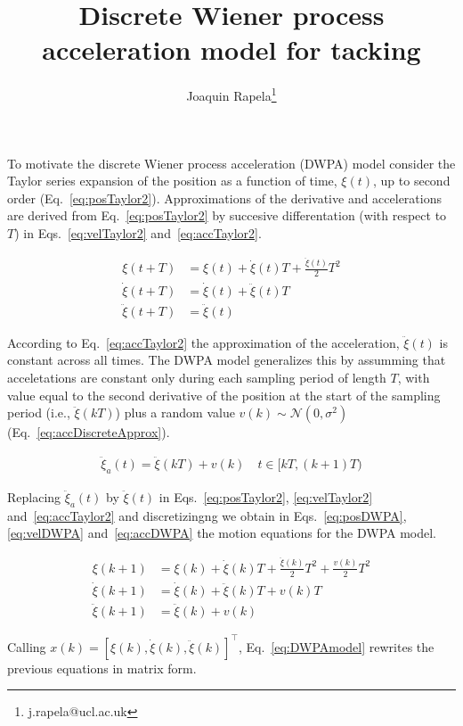 \documentclass{article}
\title{Discrete Wiener process acceleration model for tacking}
\author{Joaquin Rapela\thanks{j.rapela@ucl.ac.uk}}
\begin{document}
\maketitle

To motivate the discrete Wiener process acceleration (DWPA) model consider the
Taylor series expansion of the position as a function of time, $\xi(t)$, up to
second order (Eq.~\ref{eq:posTaylor2}). Approximations of the derivative and
accelerations are derived from Eq.~\ref{eq:posTaylor2} by succesive
differentation (with respect to $T$) in Eqs.~\ref{eq:velTaylor2}
and~\ref{eq:accTaylor2}.

\begin{align}
    \xi(t+T)&=\xi(t)+\dot{\xi}(t)T+\frac{\ddot{\xi}(t)}{2}T^2\label{eq:posTaylor2}\\
    \dot{\xi}(t+T)&=\dot{\xi}(t)+\ddot{\xi}(t)T\label{eq:velTaylor2}\\
    \ddot{\xi}(t+T)&=\ddot{\xi}(t)\label{eq:accTaylor2}
\end{align}

According to Eq.~\ref{eq:accTaylor2} the approximation of the acceleration,
$\ddot{\xi}(t)$ is constant across all times. The DWPA model generalizes this
by assumming that acceletations are constant only during each sampling period
of length $T$, with value equal to the second derivative of the position at the
start of the sampling period (i.e., $\ddot{\xi}(kT)$) plus a random value
$v(k)\sim\mathcal{N}(0,\sigma^2)$ (Eq.~\ref{eq:accDiscreteApprox}).

\begin{align}
    \ddot{\xi}_a(t)=\ddot{\xi}(kT)+v(k)\quad t\in[kT,(k+1)T)\label{eq:accDiscreteApprox}
\end{align}

Replacing $\ddot{\xi}_a(t)$ by $\ddot{\xi}(t)$ in Eqs.~\ref{eq:posTaylor2},
\ref{eq:velTaylor2} and~\ref{eq:accTaylor2} and discretizingng we obtain in
Eqs.~\ref{eq:posDWPA}, \ref{eq:velDWPA} and~\ref{eq:accDWPA} the motion
equations for the DWPA model.

\begin{align}
    \xi(k+1)&=\xi(k)+\dot{\xi}(k)T+\frac{\ddot{\xi}(k)}{2}T^2+\frac{v(k)}{2}T^2\label{eq:posDWPA}\\
    \dot{\xi}(k+1)&=\dot{\xi}(k)+\ddot{\xi}(k)T+v(k)T\label{eq:velDWPA}\\
    \ddot{\xi}(k+1)&=\ddot{\xi}(k)+v(k)\label{eq:accDWPA}
\end{align}

Calling $x(k)=[\xi(k), \dot{\xi}(k), \ddot{\xi}(k)]^\intercal$,
Eq.~\ref{eq:DWPAmodel} rewrites the previous
equations in matrix form.
\end{document}
